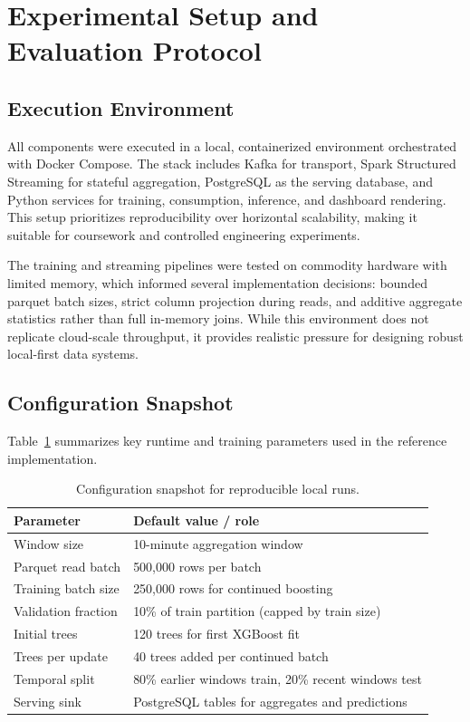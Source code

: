 \documentclass[conference]{IEEEtran}
\begin{document}
\section{Experimental Setup and Evaluation Protocol}
\subsection{Execution Environment}
All components were executed in a local, containerized environment orchestrated with Docker Compose. The stack includes Kafka for transport, Spark Structured Streaming for stateful aggregation, PostgreSQL as the serving database, and Python services for training, consumption, inference, and dashboard rendering. This setup prioritizes reproducibility over horizontal scalability, making it suitable for coursework and controlled engineering experiments.

The training and streaming pipelines were tested on commodity hardware with limited memory, which informed several implementation decisions: bounded parquet batch sizes, strict column projection during reads, and additive aggregate statistics rather than full in-memory joins. While this environment does not replicate cloud-scale throughput, it provides realistic pressure for designing robust local-first data systems.

\subsection{Configuration Snapshot}
Table~\ref{tab:config_snapshot} summarizes key runtime and training parameters used in the reference implementation.

\begin{table}[!t]
\centering
\begin{tabular}{lp{4.5cm}}
\toprule
Parameter & Default value / role \\
\midrule
Window size & 10-minute aggregation window \\
Parquet read batch & 500,000 rows per batch \\
Training batch size & 250,000 rows for continued boosting \\
Validation fraction & 10\% of train partition (capped by train size) \\
Initial trees & 120 trees for first XGBoost fit \\
Trees per update & 40 trees added per continued batch \\
Temporal split & 80\% earlier windows train, 20\% recent windows test \\
Serving sink & PostgreSQL tables for aggregates and predictions \\
\bottomrule
\end{tabular}
\caption{Configuration snapshot for reproducible local runs.}\label{tab:config_snapshot}
\end{table}
\end{document}
